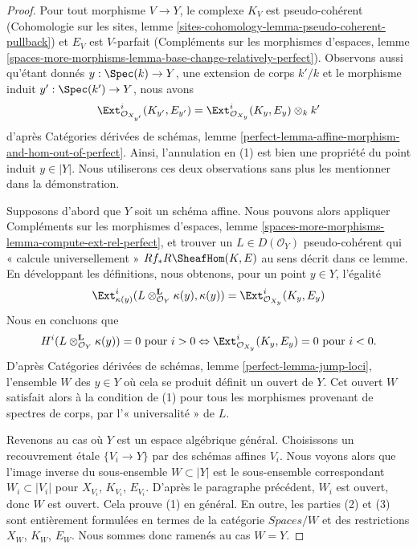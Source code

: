 \begin{proof}
Pour tout morphisme $V \to Y$, le complexe $K_V$ est pseudo-cohérent
(Cohomologie sur les sites, lemme
\ref{sites-cohomology-lemma-pseudo-coherent-pullback})
et $E_V$ est $V$-parfait (Compléments sur les morphismes d'espaces, lemme
\ref{spaces-more-morphisms-lemma-base-change-relatively-perfect}).
Observons aussi qu'étant donnés $y : \Spec(k) \to Y$, une extension de corps
$k'/k$ et le morphisme induit $y' : \Spec(k') \to Y$, nous avons
$$
\Ext^i_{\mathcal{O}_{X_{y'}}}(K_{y'}, E_{y'}) =
\Ext^i_{\mathcal{O}_{X_y}}(K_y, E_y) \otimes_k k'
$$
d'après Catégories dérivées de schémas, lemme
\ref{perfect-lemma-affine-morphism-and-hom-out-of-perfect}.
Ainsi, l'annulation en (1) est bien une propriété du point induit
$y \in |Y|$. Nous utiliserons ces deux observations sans plus les mentionner
dans la démonstration.

\medskip\noindent
Supposons d'abord que $Y$ soit un schéma affine. Nous pouvons alors appliquer
Compléments sur les morphismes d'espaces, lemme
\ref{spaces-more-morphisms-lemma-compute-ext-rel-perfect},
et trouver un $L \in D(\mathcal{O}_Y)$ pseudo-cohérent qui « calcule
universellement » $Rf_*R\SheafHom(K, E)$ au sens décrit dans ce lemme.
En développant les définitions, nous obtenons, pour un point $y \in Y$,
l'égalité
$$
\Ext^i_{\kappa(y)}(L \otimes_{\mathcal{O}_Y}^\mathbf{L} \kappa(y),
\kappa(y)) = \Ext^i_{\mathcal{O}_{X_y}}(K_y, E_y)
$$
Nous en concluons que
$$
H^i(L \otimes_{\mathcal{O}_Y}^\mathbf{L} \kappa(y)) = 0
\text{ pour } i > 0 \Leftrightarrow
\Ext^i_{\mathcal{O}_{X_y}}(K_y, E_y) = 0 \text{ pour }i < 0.
$$
D'après Catégories dérivées de schémas, lemme
\ref{perfect-lemma-jump-loci}, l'ensemble $W$ des $y \in Y$ où cela se produit
définit un ouvert de $Y$.
Cet ouvert $W$ satisfait alors à la condition de (1) pour tous les morphismes
provenant de spectres de corps, par l'« universalité » de $L$.

\medskip\noindent
Revenons au cas où $Y$ est un espace algébrique général.
Choisissons un recouvrement \'etale $\{V_i \to Y\}$ par des schémas affines
$V_i$. Nous voyons alors que l'image inverse du sous-ensemble $W \subset |Y|$
est le sous-ensemble correspondant $W_i \subset |V_i|$ pour
$X_{V_i}$, $K_{V_i}$, $E_{V_i}$.
D'après le paragraphe précédent, $W_i$ est ouvert, donc $W$ est ouvert.
Cela prouve (1) en général. En outre, les parties (2) et (3) sont entièrement
formulées en termes de la catégorie $\textit{Spaces}/W$ et des restrictions
$X_W$, $K_W$, $E_W$. Nous sommes donc ramenés au cas $W = Y$.


\end{proof}
